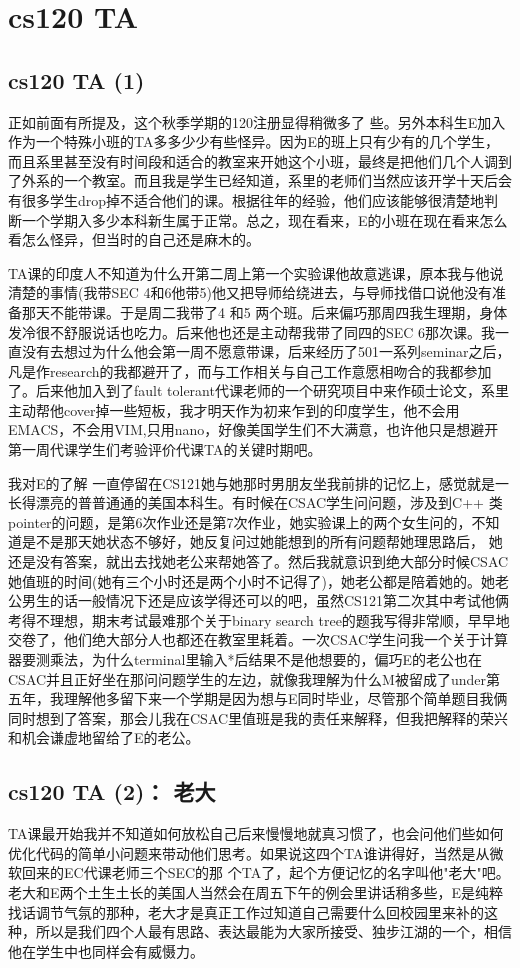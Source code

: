 \documentclass[12pt]{book}
\begin{document}
\chapter{cs120 TA}
\label{sec-20}
\section{cs120 TA (1)}
\label{sec-20-1}
正如前面有所提及，这个秋季学期的120注册显得稍微多了 些。另外本科生E加入作为一个特殊小班的TA多多少少有些怪异。因为E的班上只有少有的几个学生，而且系里甚至没有时间段和适合的教室来开她这个小班，最终是把他们几个人调到了外系的一个教室。而且我是学生已经知道，系里的老师们当然应该开学十天后会有很多学生drop掉不适合他们的课。根据往年的经验，他们应该能够很清楚地判断一个学期入多少本科新生属于正常。总之，现在看来，E的小班在现在看来怎么看怎么怪异，但当时的自己还是麻木的。

TA课的印度人不知道为什么开第二周上第一个实验课他故意逃课，原本我与他说清楚的事情(我带SEC 4和6他带5)他又把导师给绕进去，与导师找借口说他没有准备那天不能带课。于是周二我带了4 和5 两个班。后来偏巧那周四我生理期，身体发冷很不舒服说话也吃力。后来他也还是主动帮我带了同四的SEC 6那次课。我一直没有去想过为什么他会第一周不愿意带课，后来经历了501一系列seminar之后，凡是作research的我都避开了，而与工作相关与自己工作意愿相吻合的我都参加了。后来他加入到了fault tolerant代课老师的一个研究项目中来作硕士论文，系里主动帮他cover掉一些短板，我才明天作为初来乍到的印度学生，他不会用EMACS，不会用VIM,只用nano，好像美国学生们不大满意，也许他只是想避开第一周代课学生们考验评价代课TA的关键时期吧。

我对E的了解 一直停留在CS121她与她那时男朋友坐我前排的记忆上，感觉就是一长得漂亮的普普通通的美国本科生。有时候在CSAC学生问问题，涉及到C++ 类pointer的问题，是第6次作业还是第7次作业，她实验课上的两个女生问的，不知道是不是那天她状态不够好，她反复问过她能想到的所有问题帮她理思路后， 她还是没有答案，就出去找她老公来帮她答了。然后我就意识到绝大部分时候CSAC她值班的时间(她有三个小时还是两个小时不记得了)，她老公都是陪着她的。她老公男生的话一般情况下还是应该学得还可以的吧，虽然CS121第二次其中考试他俩考得不理想，期末考试最难那个关于binary search tree的题我写得非常顺，早早地交卷了，他们绝大部分人也都还在教室里耗着。一次CSAC学生问我一个关于计算器要测乘法，为什么terminal里输入*后结果不是他想要的，偏巧E的老公也在CSAC并且正好坐在那问问题学生的左边，就像我理解为什么M被留成了under第五年，我理解他多留下来一个学期是因为想与E同时毕业，尽管那个简单题目我俩同时想到了答案，那会儿我在CSAC里值班是我的责任来解释，但我把解释的荣兴和机会谦虚地留给了E的老公。

\section{cs120 TA (2)： 老大}
\label{sec-20-2}
TA课最开始我并不知道如何放松自己后来慢慢地就真习惯了，也会问他们些如何优化代码的简单小问题来带动他们思考。如果说这四个TA谁讲得好，当然是从微软回来的EC代课老师三个SEC的那 个TA了，起个方便记忆的名字叫他"老大"吧。老大和E两个土生土长的美国人当然会在周五下午的例会里讲话稍多些，E是纯粹找话调节气氛的那种，老大才是真正工作过知道自己需要什么回校园里来补的这种，所以是我们四个人最有思路、表达最能为大家所接受、独步江湖的一个，相信他在学生中也同样会有威慑力。
\end{document}
